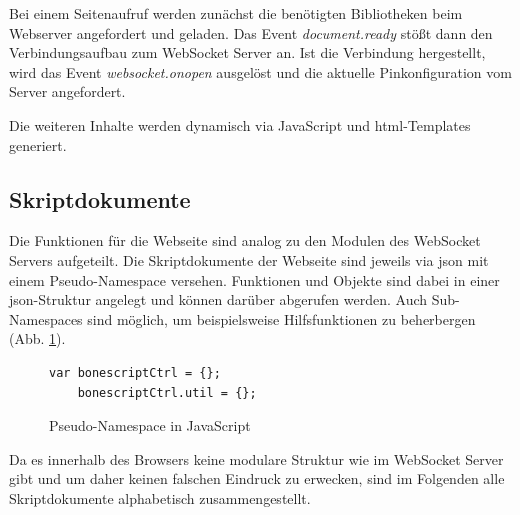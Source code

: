 \documentclass[thesis.tex]{subfiles}
\begin{document}
Bei einem Seitenaufruf werden zunächst die benötigten Bibliotheken beim Webserver angefordert und geladen. Das Event \textit{document.ready} stößt dann den Verbindungsaufbau zum WebSocket Server an. Ist die Verbindung hergestellt, wird das Event \textit{websocket.onopen} ausgelöst und die aktuelle Pinkonfiguration vom Server angefordert.

Die weiteren Inhalte werden dynamisch via JavaScript und \gls{html}-Templates generiert.


\subsection{Skriptdokumente}
Die Funktionen für die Webseite sind analog zu den Modulen des WebSocket Servers aufgeteilt. Die Skriptdokumente der Webseite sind jeweils via \gls{json} mit einem Pseudo-Namespace versehen. Funktionen und Objekte sind dabei in einer \gls{json}-Struktur angelegt und können darüber abgerufen werden. Auch Sub-Namespaces sind möglich, um beispielsweise Hilfsfunktionen zu beherbergen (Abb. \ref{lst:pseudeNamespaceJS}).

\begin{figure}[ht]
\begin{lstlisting}
var bonescriptCtrl = {};
    bonescriptCtrl.util = {};
\end{lstlisting}
\caption{Pseudo-Namespace in JavaScript}
\label{lst:pseudeNamespaceJS}
\end{figure}

Da es innerhalb des Browsers keine modulare Struktur wie im WebSocket Server gibt und um daher keinen falschen Eindruck zu erwecken, sind im Folgenden alle Skriptdokumente alphabetisch zusammengestellt.
\end{document}
